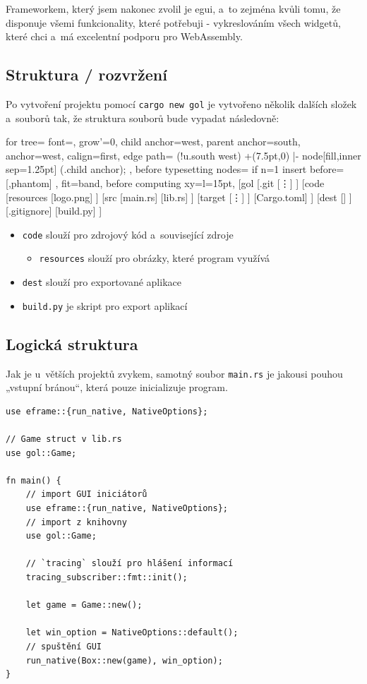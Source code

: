 \documentclass[a4paper, 12pt, twoside]{article} %
\begin{document}
		Frameworkem, který jsem nakonec zvolil je egui, a~to zejména kvůli tomu, že disponuje všemi funkcionality, které potřebuji - vykreslováním všech widgetů, které chci a~má excelentní podporu pro WebAssembly.\cite{egui}
	
	\subsection{Struktura / rozvržení}
		Po vytvoření projektu pomocí \texttt{cargo new gol} je vytvořeno několik dalších složek a~souborů tak, že struktura souborů bude vypadat následovně:
		\begin{center}
		\begin{forest}
			for tree={
			font=\ttfamily,
			grow'=0,
			child anchor=west,
			parent anchor=south,
			anchor=west,
			calign=first,
			edge path={
				\noexpand{}
				(!u.south west) +(7.5pt,0) |- node[fill,inner sep=1.25pt] {} (.child anchor);
			},
			before typesetting nodes={
				if n=1
				{insert before={[,phantom]}}
				{}
			},
			fit=band,
			before computing xy={l=15pt},
			}
		[gol
			[.git
			[\vdots]
			]
			[code
			[resources
				[logo.png]
			]
			[src
				[main.rs]
				[lib.rs]
			]
			[target
				[\vdots]
			]
			[Cargo.toml]
			]
			[dest
			[]
			]
			[.gitignore]
			[build.py]
		]
		\end{forest}
		\end{center}

		\begin{itemize}
			\item \texttt{code} slouží pro zdrojový kód a~související zdroje
			\begin{itemize}
				\item \texttt{resources} slouží pro obrázky, které program využívá
			\end{itemize}
			\item \texttt{dest} slouží pro exportované aplikace
			\item \texttt{build.py} je skript pro export aplikací
		\end{itemize}
		
	\subsection{Logická struktura}
		Jak je u~větších projektů zvykem, samotný soubor \texttt{main.rs} je jakousi pouhou „vstupní bránou“, která pouze inicializuje program. 
		
		\begin{verbatim}
use eframe::{run_native, NativeOptions};

// Game struct v lib.rs
use gol::Game;

fn main() {
    // import GUI iniciátorů
    use eframe::{run_native, NativeOptions};
    // import z knihovny
    use gol::Game;
    
    // `tracing` slouží pro hlášení informací
    tracing_subscriber::fmt::init();

    let game = Game::new();
    
    let win_option = NativeOptions::default();
    // spuštění GUI
    run_native(Box::new(game), win_option);
}
		\end{verbatim}
		
\end{document}
